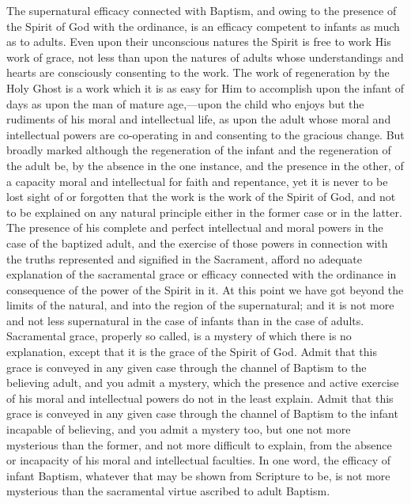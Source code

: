 \documentclass[
]{book}
\begin{document}
The supernatural efficacy connected with Baptism, and owing to the presence of the Spirit of God with the ordinance, is an efficacy competent to infants as much as to adults. Even upon their unconscious natures the Spirit is free to work His work of grace, not less than upon the natures of adults whose understandings and hearts are consciously consenting to the work. The work of regeneration by the Holy Ghost is a work which it is as easy for Him to accomplish upon the infant of days as upon the man of mature age,---upon the child who enjoys but the rudiments of his moral and intellectual life, as upon the adult whose moral and intellectual powers are co-operating in and consenting to the gracious change. But broadly marked although the regeneration of the infant and the regeneration of the adult be, by the absence in the one instance, and the presence in the other, of a capacity moral and intellectual for faith and repentance, yet it is never to be lost sight of or forgotten that the work is the work of the Spirit of God, and not to be explained on any natural principle either in the former case or in the latter. The presence of his complete and perfect intellectual and moral powers in the case of the baptized adult, and the exercise of those powers in connection with the truths represented and signified in the Sacrament, afford no adequate explanation of the sacramental grace or efficacy connected with the ordinance in consequence of the power of the Spirit in it. At this point we have got beyond the limits of the natural, and into the region of the supernatural; and it is not more and not less supernatural in the case of infants than in the case of adults. Sacramental grace, properly so called, is a mystery of which there is no explanation, except that it is the grace of the Spirit of God. Admit that this grace is conveyed in any given case through the channel of Baptism to the believing adult, and you admit a mystery, which the presence and active exercise of his moral and intellectual powers do not in the least explain. Admit that this grace is conveyed in any given case through the channel of Baptism to the infant incapable of believing, and you admit a mystery too, but one not more mysterious than the former, and not more difficult to explain, from the absence or incapacity of his moral and intellectual faculties. In one word, the efficacy of infant Baptism, whatever that may be shown from Scripture to be, is not more mysterious than the sacramental virtue ascribed to adult Baptism.
\end{document}
